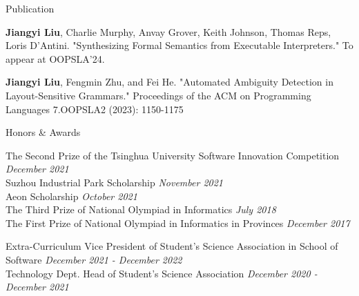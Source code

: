 \documentclass{resume} %
\newcommand{\Jul}{July }
\newcommand{\Oct}{October }
\newcommand{\Nov}{November }
\newcommand{\Dec}{December }
\begin{document}
\begin{rSection}{Publication}
  

  \textbf{Jiangyi Liu}, Charlie Murphy, Anvay Grover, Keith Johnson, Thomas Reps, Loris D'Antini. "Synthesizing Formal Semantics from Executable Interpreters." To appear at OOPSLA'24.


  \textbf{Jiangyi Liu}, Fengmin Zhu, and Fei He. "Automated Ambiguity Detection in Layout-Sensitive Grammars." Proceedings of the ACM on Programming Languages 7.OOPSLA2 (2023): 1150-1175

 
    
\end{rSection}


\begin{rSection}{Honors \& Awards}

    The Second Prize of the Tsinghua University Software Innovation Competition \hfill {\em \Dec 2021}\\
    Suzhou Industrial Park Scholarship \hfill {\em \Nov 2021}\\
    Aeon Scholarship \hfill {\em \Oct 2021}\\
    The Third Prize of National Olympiad in Informatics \hfill {\em \Jul 2018}\\
    The First Prize of National Olympiad in Informatics in Provinces \hfill {\em \Dec 2017}\\

    
\end{rSection}

\begin{rSection}{Extra-Curriculum}
Vice President of Student's Science Association in School of Software \hfill {\em \Dec 2021 - \Dec 2022}\\
Technology Dept. Head of Student's Science Association \hfill {\em \Dec 2020 - \Dec 2021}


\end{rSection}
\end{document}
